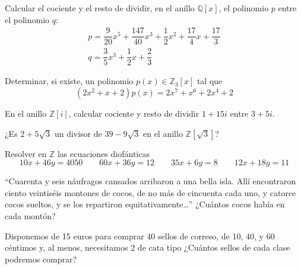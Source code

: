 \begin{ejercicio}
    Calcular el cociente y el resto de dividir, en el anillo $\mathbb{Q}[x]$, el polinomio $p$ entre el polinomio $q$:
    \begin{gather*}
        p = \dfrac{9}{20}x^5 + \dfrac{147}{40}x^3+\dfrac{1}{2}x^2+\dfrac{17}{4}x+\dfrac{17}{3} \\
        q = \dfrac{3}{5}x^3+\dfrac{1}{2}x+\dfrac{2}{3}
    \end{gather*}
\end{ejercicio}

\begin{ejercicio}
    Determinar, si existe, un polinomio $p(x)\in \mathbb{Z}_3[x]$ tal que
    \begin{equation*}
        (2x^2+x+2)p(x) = 2x^7 + x^6 + 2x^4 + 2
    \end{equation*}
\end{ejercicio}

\begin{ejercicio}
    En el anillo $\mathbb{Z}[i]$, calcular cociente y resto de dividir $1+15i$ entre $3+5i$.
\end{ejercicio}

\begin{ejercicio}
    ¿Es $2+5\sqrt{3}$ un divisor de $39-9\sqrt{3}$ en el anillo $\mathbb{Z}\left[\sqrt{3}\right]$?
\end{ejercicio}

\begin{ejercicio}
    Resolver en $\mathbb{Z}$ las ecuaciones diofánticas
    \begin{equation*}
        10x + 46y = 4050 \qquad 60x+36y = 12 \qquad 35x+6y=8 \qquad 12x+18y = 11
    \end{equation*}
\end{ejercicio}

\begin{ejercicio}
    ``Cuarenta y seis náufragos cansados arribaron a una bella isla. Allí encontraron ciento veintiséis montones de cocos, de no más de cincuenta cada uno, y catorce cocos sueltos, y se los repartiron equitativamente\ldots'' ¿Cuántos cocos había en cada montón?
\end{ejercicio}

\begin{ejercicio}
    Disponemos de 15 euros para comprar 40 sellos de correso, de 10, 40, y 60 céntimos y, al menos, necesitamos 2 de cata tipo ¿Cuántos sellos de cada clase podremos comprar?
\end{ejercicio}

